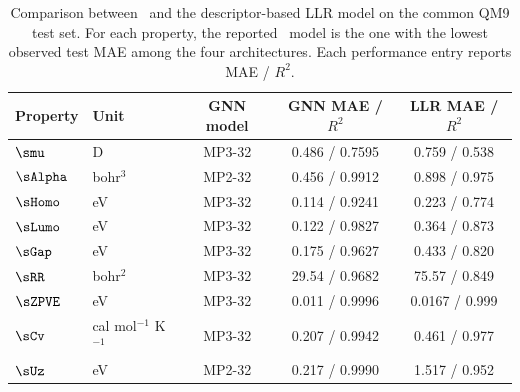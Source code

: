 \begin{table}[t!]
\centering
\caption{Comparison between \GNN\ and the descriptor-based LLR model on
the common QM9 test set.
For each property, the reported \GNN\ model is the one with the lowest
observed test MAE among the four architectures.
Each performance entry reports MAE / $R^2$.}
\label{tab:gnn-llr-comparison}

\footnotesize
\setlength{\tabcolsep}{4pt}
\begin{tabular}{@{}llccc@{}}
\toprule
Property & Unit & GNN model & GNN MAE / $R^2$ & LLR MAE / $R^2$ \\
\midrule
$\smu$    & D                         & MP3-32 & 0.486 / 0.7595 & 0.759 / 0.538 \\
$\sAlpha$ & bohr$^3$                  & MP2-32 & 0.456 / 0.9912 & 0.898 / 0.975 \\
$\sHomo$  & eV                        & MP3-32 & 0.114 / 0.9241 & 0.223 / 0.774 \\
$\sLumo$  & eV                        & MP3-32 & 0.122 / 0.9827 & 0.364 / 0.873 \\
$\sGap$   & eV                        & MP3-32 & 0.175 / 0.9627 & 0.433 / 0.820 \\
$\sRR$    & bohr$^2$                  & MP3-32 & 29.54 / 0.9682 & 75.57 / 0.849 \\
$\sZPVE$  & eV                        & MP3-32 & 0.011 / 0.9996 & 0.0167 / 0.999 \\
$\sCv$    & cal mol$^{-1}$ K$^{-1}$  & MP3-32 & 0.207 / 0.9942 & 0.461 / 0.977 \\
$\sUz$    & eV                        & MP2-32 & 0.217 / 0.9990 & 1.517 / 0.952 \\
\bottomrule
\end{tabular}
\end{table}